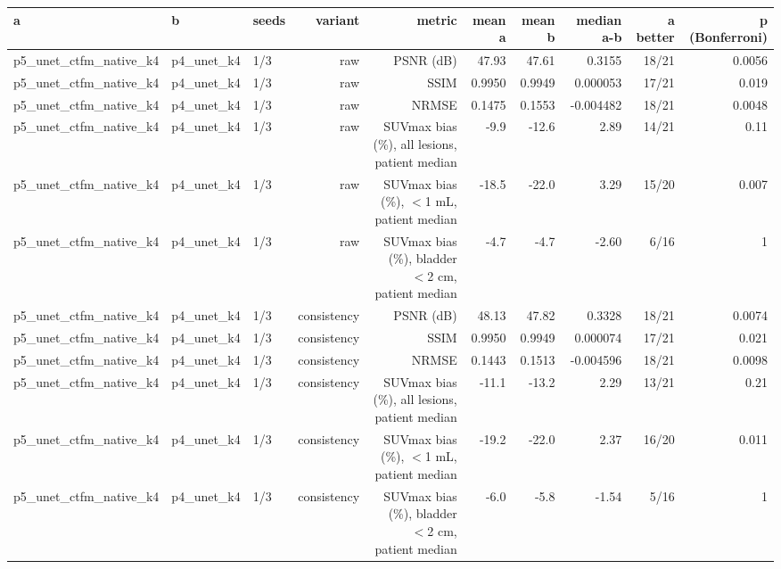 \begin{tabular}{lllrrrrrrr}
\toprule
a & b & seeds & variant & metric & mean a & mean b & median a-b & a better & p (Bonferroni) \\
\midrule
p5\_unet\_ctfm\_native\_k4 & p4\_unet\_k4 & 1/3 & raw & PSNR (dB) & 47.93 & 47.61 & 0.3155 & 18/21 & 0.0056 \\
p5\_unet\_ctfm\_native\_k4 & p4\_unet\_k4 & 1/3 & raw & SSIM & 0.9950 & 0.9949 & 0.000053 & 17/21 & 0.019 \\
p5\_unet\_ctfm\_native\_k4 & p4\_unet\_k4 & 1/3 & raw & NRMSE & 0.1475 & 0.1553 & -0.004482 & 18/21 & 0.0048 \\
p5\_unet\_ctfm\_native\_k4 & p4\_unet\_k4 & 1/3 & raw & SUVmax bias (\%), all lesions, patient median & -9.9 & -12.6 & 2.89 & 14/21 & 0.11 \\
p5\_unet\_ctfm\_native\_k4 & p4\_unet\_k4 & 1/3 & raw & SUVmax bias (\%), $<$1 mL, patient median & -18.5 & -22.0 & 3.29 & 15/20 & 0.007 \\
p5\_unet\_ctfm\_native\_k4 & p4\_unet\_k4 & 1/3 & raw & SUVmax bias (\%), bladder $<$2 cm, patient median & -4.7 & -4.7 & -2.60 & 6/16 & 1 \\
p5\_unet\_ctfm\_native\_k4 & p4\_unet\_k4 & 1/3 & consistency & PSNR (dB) & 48.13 & 47.82 & 0.3328 & 18/21 & 0.0074 \\
p5\_unet\_ctfm\_native\_k4 & p4\_unet\_k4 & 1/3 & consistency & SSIM & 0.9950 & 0.9949 & 0.000074 & 17/21 & 0.021 \\
p5\_unet\_ctfm\_native\_k4 & p4\_unet\_k4 & 1/3 & consistency & NRMSE & 0.1443 & 0.1513 & -0.004596 & 18/21 & 0.0098 \\
p5\_unet\_ctfm\_native\_k4 & p4\_unet\_k4 & 1/3 & consistency & SUVmax bias (\%), all lesions, patient median & -11.1 & -13.2 & 2.29 & 13/21 & 0.21 \\
p5\_unet\_ctfm\_native\_k4 & p4\_unet\_k4 & 1/3 & consistency & SUVmax bias (\%), $<$1 mL, patient median & -19.2 & -22.0 & 2.37 & 16/20 & 0.011 \\
p5\_unet\_ctfm\_native\_k4 & p4\_unet\_k4 & 1/3 & consistency & SUVmax bias (\%), bladder $<$2 cm, patient median & -6.0 & -5.8 & -1.54 & 5/16 & 1 \\
\bottomrule
\end{tabular}
